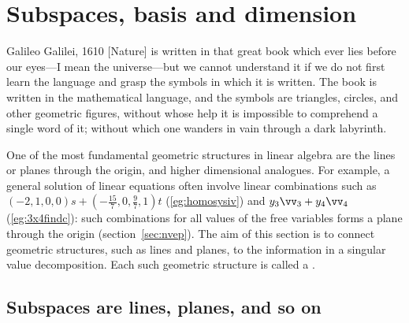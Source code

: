 
\section{Subspaces, basis and dimension}
\label{sec:sbd}
\secttoc

\begin{comment}
\pooliv{\S3.5, p191--206} \layiv{\S4.1--3} \holti{\S4.1--3}
\end{comment}


\begin{quoted}{Galileo Galilei, 1610}
[Nature] is written in that great book which ever lies before our eyes---I mean the universe---but we cannot understand it if we do not first learn the language and grasp the symbols in which it is written. 
The book is written in the mathematical language, and the symbols are triangles, circles, and other geometric figures, without whose help it is impossible to comprehend a single word of it; without which one wanders in vain through a dark labyrinth.
\end{quoted}


One of the most fundamental geometric structures in linear algebra are the lines or planes through the origin, and higher dimensional analogues.
For example, a general solution of linear equations often involve linear combinations such as \((-2,1,0,0)s+(-\frac{15}7,0,\frac97,1)t\) (\autoref{eg:homosysiv}) and \(y_3\vv_3+y_4\vv_4\) (\autoref{eg:3x4findc}): such combinations for all values of the free variables forms a plane through the origin (section~\ref{sec:nvep}).
The aim of this section is to connect geometric structures, such as lines and planes, to the information in a singular value decomposition.
Each such geometric structure is called a .


\subsection{Subspaces are lines, planes, and so on}

